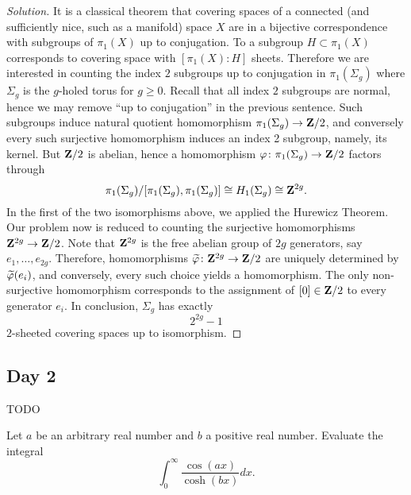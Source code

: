 \begin{proof}[Solution]
  It is a classical theorem that covering spaces of a connected (and sufficiently nice, such as a manifold) space $X$ are in a bijective correspondence with subgroups of $\pi_1(X)$ up to conjugation. To a subgroup $H \subset \pi_1(X)$ corresponds to covering space with $[\pi_1(X):H]$ sheets. Therefore we are interested in counting the index $2$ subgroups up to conjugation in $\pi_1(\Sigma_g)$ where $\Sigma_g$ is the $g$-holed torus for $g \geq 0$. Recall that all index $2$ subgroups are normal, hence we may remove ``up to conjugation'' in the previous sentence. Such subgroups induce natural quotient homomorphism $\pi_1(\Sigma_g) \rightarrow \mathbf{Z}/2$, and conversely every such surjective homomorphism induces an index 2 subgroup, namely, its kernel. But $\mathbf{Z}/2$ is abelian, hence a homomorphism $\varphi \colon \pi_1(\Sigma_g) \rightarrow \mathbf{Z}/2$ factors through
  \[
  \pi_1(\Sigma_g)/[\pi_1(\Sigma_g),\pi_1(\Sigma_g)] \cong H_1(\Sigma_g) \cong \mathbf{Z}^{2g}.
  \]
  In the first of the two isomorphisms above, we applied the Hurewicz Theorem. Our problem now is reduced to counting the surjective homomorphisms $\mathbf{Z}^{2g} \rightarrow \mathbf{Z}/2$. Note that $\mathbf{Z}^{2g}$ is the free abelian group of $2g$ generators, say $e_1, \dots, e_{2g}$. Therefore, homomorphisms $\widetilde{\varphi} \colon \mathbf{Z}^{2g} \rightarrow \mathbf{Z}/2$ are uniquely determined by $\widetilde{\varphi}(e_i)$, and conversely, every such choice yields a homomorphism. The only non-surjective homomorphism corresponds to the assignment of $[0] \in \mathbf{Z}/2$ to every generator $e_i$. In conclusion, $\Sigma_g$ has exactly
  \[
  2^{2g}-1
  \]
  $2$-sheeted covering spaces up to isomorphism.
\end{proof}

\subsection{Day 2}
\label{S:spring-2010-2}
\mbox{}


TODO


Let $a$ be an arbitrary real number and $b$ a positive real number. Evaluate the integral
\[
\int_0^\infty \frac{\cos(a x)}{\cosh(b x)} d x.
\]

